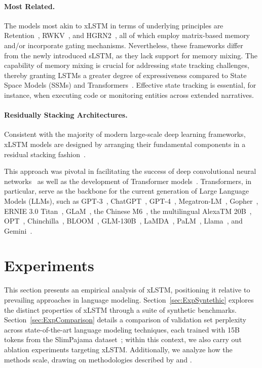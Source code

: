 \paragraph{Most Related.} The models most akin to xLSTM in terms of underlying principles are Retention~\citep{Sun:23arxiv}, RWKV~\citep{Peng:23arxivshort,Peng:24arxivshort}, and HGRN2~\citep{Qin:24arxiv}, all of which employ matrix-based memory and/or incorporate gating mechanisms. Nevertheless, these frameworks differ from the newly introduced sLSTM, as they lack support for memory mixing. The capability of memory mixing is crucial for addressing state tracking challenges, thereby granting LSTMs a greater degree of expressiveness compared to State Space Models (SSMs) and Transformers~\citep{Merrill:24,Deletang:23}. Effective state tracking is essential, for instance, when executing code or monitoring entities across extended narratives.

\paragraph{Residually Stacking Architectures.} Consistent with the majority of modern large-scale deep learning frameworks, xLSTM models are designed by arranging their fundamental components in a residual stacking fashion~\citep{Srivastava:15,He:16}.

This approach was pivotal in facilitating the success of deep convolutional neural networks~\citep{He:16} as well as the development of Transformer models~\citep{Vaswani:17}. Transformers, in particular, serve as the backbone for the current generation of Large Language Models (LLMs), such as GPT-3~\citep{Brown:20short}, ChatGPT~\citep{Schulman:22short}, GPT-4~\citep{Achiam:23gpt4short}, Megatron-LM~\citep{Shoeybi:19}, Gopher~\citep{Rae:21short}, ERNIE 3.0 Titan~\citep{Wang:21arxivshort}, GLaM~\citep{Du:21glamshort}, the Chinese M6~\citep{Lin:21}, the multilingual AlexaTM 20B~\citep{Soltan:22}, OPT~\citep{Zhang:22opt}, Chinchilla~\citep{Hoffmann:22short}, BLOOM~\citep{Scao:22arxivshort}, GLM-130B~\citep{Zeng:22arxivshort}, LaMDA~\citep{Thoppilan:22short}, PaLM~\citep{Chowdhery:22short}, Llama~\citep{Touvron:23arxiv}, and Gemini~\citep{GeminiTeam:23arxiv,Reid:24arxiv}.

\section{Experiments}
\label{sec:Exp}

This section presents an empirical analysis of xLSTM, positioning it relative to prevailing approaches in language modeling. Section~\ref{sec:ExpSyntethic} explores the distinct properties of xLSTM through a suite of synthetic benchmarks. Section~\ref{sec:ExpComparison} details a comparison of validation set perplexity across state-of-the-art language modeling techniques, each trained with 15B tokens from the SlimPajama dataset~\citep{Soboleva:23}; within this context, we also carry out ablation experiments targeting xLSTM. Additionally, we analyze how the methods scale, drawing on methodologies described by \citet{Kaplan:20} and \citet{Brown:20short}.

